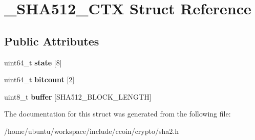 \hypertarget{struct__SHA512__CTX}{\section{\-\_\-\-S\-H\-A512\-\_\-\-C\-T\-X Struct Reference}
\label{struct__SHA512__CTX}
}
\subsection*{Public Attributes}
\begin{DoxyCompactItemize}
\item 
\hypertarget{struct__SHA512__CTX_a9a53dc66589d57d3e34d68a983252fc9}{uint64\-\_\-t {\bfseries state} \mbox{[}8\mbox{]}}\label{struct__SHA512__CTX_a9a53dc66589d57d3e34d68a983252fc9}

\item 
\hypertarget{struct__SHA512__CTX_a6545d179b1f548c14adb1ee7f900de6a}{uint64\-\_\-t {\bfseries bitcount} \mbox{[}2\mbox{]}}\label{struct__SHA512__CTX_a6545d179b1f548c14adb1ee7f900de6a}

\item 
\hypertarget{struct__SHA512__CTX_a218417630503a9591d36d0ee63eca048}{uint8\-\_\-t {\bfseries buffer} \mbox{[}S\-H\-A512\-\_\-\-B\-L\-O\-C\-K\-\_\-\-L\-E\-N\-G\-T\-H\mbox{]}}\label{struct__SHA512__CTX_a218417630503a9591d36d0ee63eca048}

\end{DoxyCompactItemize}


The documentation for this struct was generated from the following file\-:\begin{DoxyCompactItemize}
\item 
/home/ubuntu/workspace/include/ccoin/crypto/sha2.\-h\end{DoxyCompactItemize}
